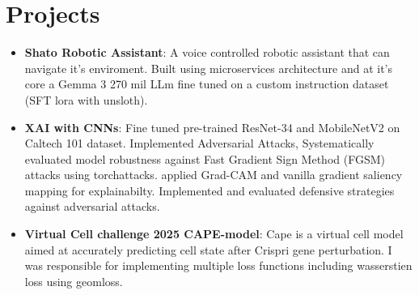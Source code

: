 \documentclass[letterpaper,11pt]{article}
\newcommand{\resumeItem}[2]{
  \item\small{
    \textbf{#1}{: #2 \vspace{-2pt}}
  }
}
\newcommand{\resumeSubItem}[2]{\resumeItem{#1}{#2}\vspace{-4pt}}
\newcommand{\resumeSubHeadingListStart}{\begin{itemize}[leftmargin=*]}
\newcommand{\resumeSubHeadingListEnd}{\end{itemize}}
\begin{document}
\section{Projects}
  \resumeSubHeadingListStart
    \resumeSubItem{Shato Robotic Assistant}
      {A voice controlled robotic assistant that can navigate it's enviroment. Built using microservices architecture and at it's core a Gemma 3 270 mil LLm fine tuned on a custom instruction dataset (SFT lora with unsloth). }
    \resumeSubItem{XAI with CNNs}
      {Fine tuned pre-trained ResNet-34 and MobileNetV2 on Caltech 101 dataset. Implemented Adversarial Attacks, Systematically evaluated model robustness against Fast Gradient Sign Method (FGSM) attacks using torchattacks. applied Grad-CAM and vanilla gradient saliency mapping for explainabilty. Implemented and evaluated defensive strategies against adversarial attacks.}
    \resumeSubItem{Virtual Cell challenge 2025 CAPE-model}
      {Cape is a virtual cell model aimed at accurately predicting cell state after Crispri gene perturbation. I was responsible for implementing multiple loss functions including wasserstien loss using geomloss.}

  \resumeSubHeadingListEnd
\end{document}
